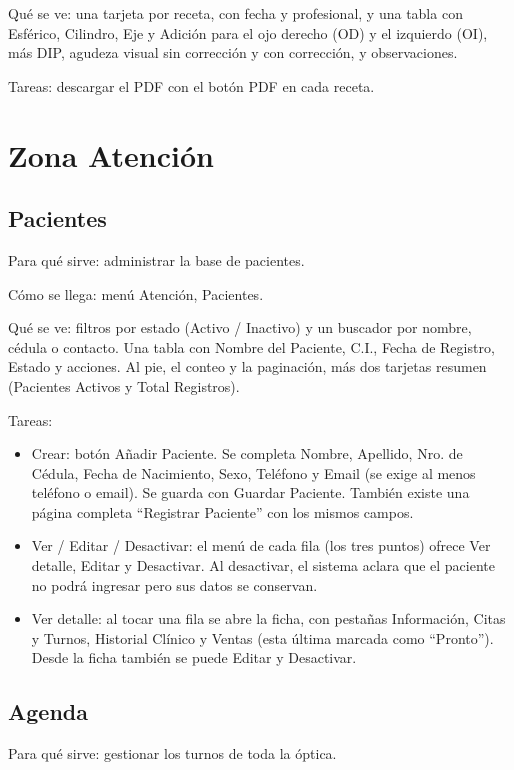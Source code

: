 Qué se ve: una tarjeta por receta, con fecha y profesional, y una tabla con Esférico, Cilindro, Eje y Adición para el ojo derecho (OD) y el izquierdo (OI), más DIP, agudeza visual sin corrección y con corrección, y observaciones.

Tareas: descargar el PDF con el botón PDF en cada receta.

\section{Zona Atención}
\label{sec:mu-zona-atencion}

\subsection{Pacientes}
\label{sec:mu-pacientes}

Para qué sirve: administrar la base de pacientes.

Cómo se llega: menú Atención, Pacientes.

Qué se ve: filtros por estado (Activo / Inactivo) y un buscador por nombre, cédula o contacto. Una tabla con Nombre del Paciente, C.I., Fecha de Registro, Estado y acciones. Al pie, el conteo y la paginación, más dos tarjetas resumen (Pacientes Activos y Total Registros).

Tareas:
\begin{itemize}
  \item Crear: botón Añadir Paciente. Se completa Nombre, Apellido, Nro. de Cédula, Fecha de Nacimiento, Sexo, Teléfono y Email (se exige al menos teléfono o email). Se guarda con Guardar Paciente. También existe una página completa ``Registrar Paciente'' con los mismos campos.
  \item Ver / Editar / Desactivar: el menú de cada fila (los tres puntos) ofrece Ver detalle, Editar y Desactivar. Al desactivar, el sistema aclara que el paciente no podrá ingresar pero sus datos se conservan.
  \item Ver detalle: al tocar una fila se abre la ficha, con pestañas Información, Citas y Turnos, Historial Clínico y Ventas (esta última marcada como ``Pronto''). Desde la ficha también se puede Editar y Desactivar.
\end{itemize}

\subsection{Agenda}
\label{sec:mu-agenda}

Para qué sirve: gestionar los turnos de toda la óptica.

